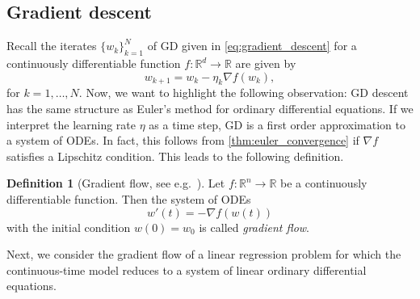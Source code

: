 \documentclass[12pt]{article}
\theoremstyle{definition}
\newtheorem{definition}[definition]{Definition}
\numberwithin{equation}{section}
\newcommand{\R}{\mathbb{R}}
\begin{document}
\subsection{Gradient descent}
\label{sec:gradient_flow}
Recall the iterates $\{ w_k\}_{k=1}^N$ of GD given in \eqref{eq:gradient_descent} for a continuously differentiable function $f : \R^d \rightarrow \R$ are given by
\begin{equation*}
  w_{k+1} = w_{k} - \eta_k \nabla f(w_{k}),
\end{equation*}
for $k=1,\dots,N$. Now, we want to highlight the following observation: GD descent has the same structure as Euler's method for ordinary differential equations. If we interpret the learning rate $\eta$ as a time step, GD is a first order approximation to a system of ODEs. In fact, this follows from \autoref{thm:euler_convergence} if $\nabla f$ satisfies a Lipschitz condition. This leads to the following definition.
\begin{definition}[Gradient flow, see e.g.\ ]
  Let $f : \R^n \rightarrow \R$ be a continuously differentiable function. Then the system of ODEs
  \begin{equation}
  \label{eq:gradient_flow}
  w'(t) = - \nabla f(w(t))
  \end{equation}
  with the initial condition $w(0) = w_{0}$ is called \emph{gradient flow}.
\end{definition}
Next, we consider the gradient flow of a linear regression problem for which the continuous-time model reduces to a system of linear ordinary differential equations.
\end{document}
